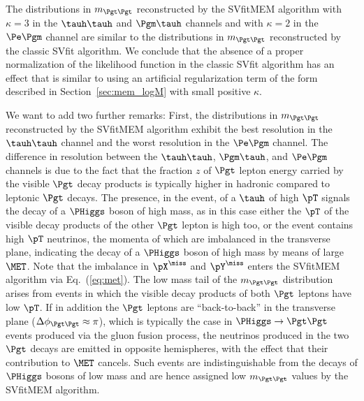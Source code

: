 The distributions in $m_{\Pgt\Pgt}$ reconstructed by the SVfitMEM
algorithm with $\kappa = 3$ in the $\tauh\tauh$ and $\Pgm\tauh$ channels and with $\kappa = 2$ in the $\Pe\Pgm$ channel
are similar to the distributions in $m_{\Pgt\Pgt}$ reconstructed by the classic SVfit algorithm.
We conclude that the absence of a proper normalization of the likelihood function in the classic SVfit algorithm
has an effect that is similar to using an artificial regularization term of the form described in Section~\ref{sec:mem_logM} with small positive $\kappa$.

We want to add two further remarks:
First, the distributions in $m_{\Pgt\Pgt}$ reconstructed by the SVfitMEM algorithm 
exhibit the best resolution in the $\tauh\tauh$ channel and the worst resolution in the $\Pe\Pgm$ channel.
The difference in resolution between the $\tauh\tauh$, $\Pgm\tauh$, and $\Pe\Pgm$ channels
is due to the fact that the fraction $z$ of $\Pgt$ lepton energy carried by the visible $\Pgt$ decay
products is typically higher in hadronic compared to leptonic $\Pgt$ decays.
The presence, in the event, of a $\tauh$ of high $\pT$ signals the decay of a
$\PHiggs$ boson of high mass,
as in this case either the $\pT$ of the visible decay products of the
other $\Pgt$ lepton is high too,
or the event contains high $\pT$ neutrinos, the momenta of which are imbalanced in the transverse plane,
indicating the decay of a $\PHiggs$ boson of high mass  by means of large $\MET$.
Note that the imbalance in $\pX^{\miss}$ and $\pY^{\miss}$ enters the SVfitMEM algorithm via Eq.~(\ref{eq:met}).
The low mass tail of the $m_{\Pgt\Pgt}$ distribution arises from events in which the visible decay products of both $\Pgt$ leptons have low $\pT$.
If in addition the $\Pgt$ leptons are ``back-to-back'' in the transverse plane ($\Delta\phi_{\Pgt\Pgt} \approx \pi$),
which is typically the case in $\PHiggs \to \Pgt\Pgt$ events produced via the gluon fusion process,
the neutrinos produced in the two $\Pgt$ decays are emitted in opposite hemispheres, 
with the effect that their contribution to $\MET$ cancels.
Such events are indistinguishable from the decays of $\PHiggs$ bosons of low mass
and are hence assigned low $m_{\Pgt\Pgt}$ values by the SVfitMEM algorithm.

